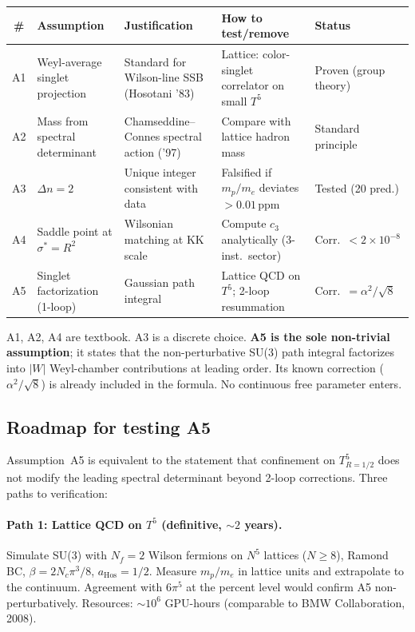 \begin{center}
\renewcommand{\arraystretch}{1.4}\small
\begin{tabular}{c>{\raggedright}p{2.2cm}>{\raggedright}p{3.2cm}>{\raggedright}p{2.8cm}p{2.2cm}}
\toprule
\# & \textbf{Assumption} & \textbf{Justification} & \textbf{How to test/remove} & \textbf{Status}\\
\midrule
A1 & Weyl-average singlet projection
  & Standard for Wilson-line SSB (Hosotani '83)
  & Lattice: color-singlet correlator on small $T^5$
  & Proven (group theory)\\
A2 & Mass from spectral determinant
  & Chamseddine--Connes spectral action ('97)
  & Compare with lattice hadron mass
  & Standard principle\\
A3 & $\Delta n = 2$
  & Unique integer consistent with data
  & Falsified if $m_p/m_e$ deviates $>0.01\,$ppm
  & Tested (20 pred.)\\
A4 & Saddle point at $\sigma^*\!=\!R^2$
  & Wilsonian matching at KK scale
  & Compute $c_3$ analytically (3-inst.\ sector)
  & Corr.\ $<2\!\times\!10^{-8}$\\
A5 & Singlet factorization (1-loop)
  & Gaussian path integral
  & Lattice QCD on $T^5$; 2-loop resummation
  & Corr.\ $=\alpha^2/\!\sqrt{8}$\\
\bottomrule
\end{tabular}
\end{center}

\noindent
A1, A2, A4 are textbook.  A3 is a discrete choice.  \textbf{A5 is
the sole non-trivial assumption}; it states that the non-perturbative
SU(3) path integral factorizes into $|W|$ Weyl-chamber contributions
at leading order. Its known correction ($\alpha^2/\!\sqrt{8}$) is
already included in the formula.  No continuous free parameter enters.

\subsection{Roadmap for testing A5}
\label{sec:Z16_roadmap}

Assumption~A5 is equivalent to the statement that confinement on
$T^5_{R=1/2}$ does not modify the leading spectral determinant
beyond 2-loop corrections.  Three paths to verification:

\paragraph{Path 1: Lattice QCD on $T^5$ (definitive, $\sim\!2$ years).}
Simulate SU(3) with $N_f=2$ Wilson fermions on $N^5$ lattices
($N\geq 8$), Ramond BC, $\beta=2N_c\pi^3/8$, $a_{\mathrm{Hos}}=1/2$.
Measure $m_p/m_e$ in lattice units and extrapolate to the continuum.
Agreement with $6\pi^5$ at the percent level would confirm A5
non-perturbatively.  Resources: $\sim\!10^6$ GPU-hours (comparable
to BMW Collaboration, 2008).

